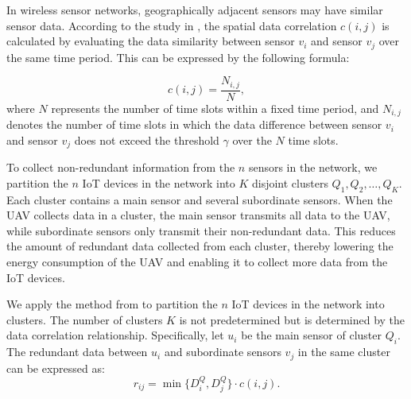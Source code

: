 \documentclass[sigconf]{acmart}
\begin{document}


In wireless sensor networks, geographically adjacent sensors may have similar sensor data. According to the study in \cite{8-Minimizing_redundant}, the spatial data correlation $c(i,j)$ is calculated by evaluating the data similarity between sensor $v_i$ and sensor $v_j$ over the same time period. This can be expressed by the following formula:

\begin{equation}
    c(i,j)=\frac{N_{i,j}}{N},
\end{equation}
where $N$ represents the number of time slots within a fixed time period, and $N_{i,j}$ denotes the number of time slots in which the data difference between sensor $v_i$ and sensor $v_j$ does not exceed the threshold $\gamma$ over the $N$ time slots.

To collect non-redundant information from the $n$ sensors in the network, we partition the $n$ IoT devices in the network into $K$ disjoint clusters $Q_1,Q_2,\ldots,Q_{K}$. Each cluster contains a main sensor and several subordinate sensors. When the UAV collects data in a cluster, the main sensor transmits all data to the UAV, while subordinate sensors only transmit their non-redundant data. This reduces the amount of redundant data collected from each cluster, thereby lowering the energy consumption of the UAV and enabling it to collect more data from the IoT devices.

We apply the method from \cite{8-Minimizing_redundant} to partition the $n$ IoT devices in the network into clusters. The number of clusters $K$ is not predetermined but is determined by the data correlation relationship. Specifically, let $u_i$ be the main sensor of cluster $Q_i$. The redundant data between $u_i$ and subordinate sensors $v_j$ in the same cluster can be expressed as:
\begin{equation}
    r_{ij}=\min\{D_{i}^{Q},D_{j}^{Q}\}\cdot c(i,j).
\end{equation}
\end{document}
